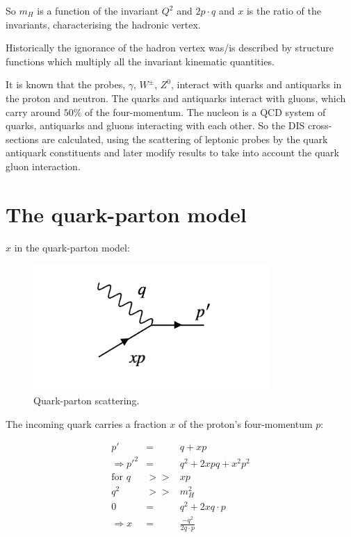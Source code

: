 So $m_H$ is a function of the invariant $Q^2$ and $2p \cdot q$ and $x$ is the ratio of the invariants, characterising the hadronic vertex.

Historically the ignorance of the hadron vertex was/is described by structure functions which multiply all the invariant kinematic quantities.

It is known that the probes, $\gamma$, $W^{\pm}$, $Z^0$, interact with quarks and antiquarks in the proton and neutron.  The quarks and antiquarks interact with gluons, which carry around $50\%$ of the four-momentum.  The nucleon is a QCD system of quarks, antiquarks and gluons interacting with each other.  So the DIS cross-sections are calculated, using the scattering of leptonic probes by the quark antiquark constituents and later modify results to take into account the quark gluon interaction.

\section{The quark-parton model}

$x$ in the quark-parton model:

\begin{figure}[!htb]
  \begin{center}
    \includegraphics[width=0.8\textwidth]{images/web_feynman/image_61.png}
    \caption[Quark-parton scattering]{Quark-parton scattering.}
    \label{fig:ch14_quarkPartonScattering}
  \end{center}
\end{figure}

The incoming quark carries a fraction $x$ of the proton's four-momentum $p$:

\begin{eqnarray*}
  p' & = & q + xp \\
  \Rightarrow p'^2 & = & q^2 + 2xpq + x^2p^2 \\
  \textrm{for } q & >> & xp \\
  q^2 & >> & m_H^2 \\
  0 & = & q^2 + 2xq \cdot p \\
  \Rightarrow x & = & \frac{-q^2}{2q \cdot p}
\end{eqnarray*}

